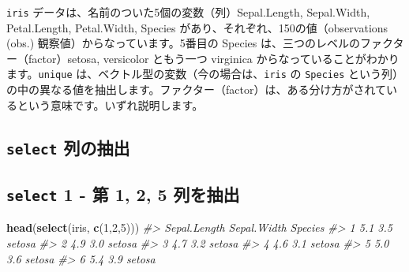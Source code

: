 \documentclass[
  xelatex, ja=standard]{bxjsbook}
\newenvironment{Shaded}{\begin{snugshade}}{\end{snugshade}}
\newcommand{\CommentTok}[1]{\textcolor[rgb]{0.56,0.35,0.01}{\textit{#1}}}
\newcommand{\DecValTok}[1]{\textcolor[rgb]{0.00,0.00,0.81}{#1}}
\newcommand{\FunctionTok}[1]{\textcolor[rgb]{0.13,0.29,0.53}{\textbf{#1}}}
\newcommand{\NormalTok}[1]{#1}
\newcommand{\SpecialCharTok}[1]{\textcolor[rgb]{0.81,0.36,0.00}{\textbf{#1}}}
\theoremstyle{definition}
\theoremstyle{definition}
\theoremstyle{definition}
\theoremstyle{definition}
\theoremstyle{remark}
\begin{document}
\texttt{iris} データは、名前のついた5個の変数（列）Sepal.Length, Sepal.Width, Petal.Length, Petal.Width, Species があり、それぞれ、150の値（observations (obs.) 観察値）からなっています。5番目の Species は、三つのレベルのファクター（factor）setosa, versicolor ともう一つ virginica からなっていることがわかります。\texttt{unique} は、ベクトル型の変数（今の場合は、\texttt{iris} の \texttt{Species} という列）の中の異なる値を抽出します。ファクター（factor）は、ある分け方がされているという意味です。いずれ説明します。

\begin{Shaded}
\end{Shaded}

\hypertarget{select-ux5217ux306eux62bdux51fa}{%
\subsection{\texorpdfstring{\texttt{select} 列の抽出}{select 列の抽出}}\label{select-ux5217ux306eux62bdux51fa}}

\hypertarget{select-1---ux7b2c-1-2-5-ux5217ux3092ux62bdux51fa}{%
\subsection{\texorpdfstring{\texttt{select} 1 - 第 1, 2, 5 列を抽出}{select 1 - 第 1, 2, 5 列を抽出}}\label{select-1---ux7b2c-1-2-5-ux5217ux3092ux62bdux51fa}}

\begin{Shaded}
\begin{Highlighting}[]
\FunctionTok{head}\NormalTok{(}\FunctionTok{select}\NormalTok{(iris, }\FunctionTok{c}\NormalTok{(}\DecValTok{1}\NormalTok{,}\DecValTok{2}\NormalTok{,}\DecValTok{5}\NormalTok{)))}
\CommentTok{\#\textgreater{}   Sepal.Length Sepal.Width Species}
\CommentTok{\#\textgreater{} 1          5.1         3.5  setosa}
\CommentTok{\#\textgreater{} 2          4.9         3.0  setosa}
\CommentTok{\#\textgreater{} 3          4.7         3.2  setosa}
\CommentTok{\#\textgreater{} 4          4.6         3.1  setosa}
\CommentTok{\#\textgreater{} 5          5.0         3.6  setosa}
\CommentTok{\#\textgreater{} 6          5.4         3.9  setosa}
\end{Highlighting}
\end{Shaded}
\end{document}
